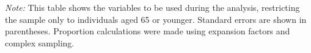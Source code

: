 \begin{table}[htpb]
\vspace{1ex}
\raggedright
\footnotesize \textit{Note:} This table shows the variables to be used during the analysis, restricting the sample only to individuals aged 65 or younger. Standard errors are shown in parentheses. Proportion calculations were made using expansion factors and complex sampling.
\end{table}
